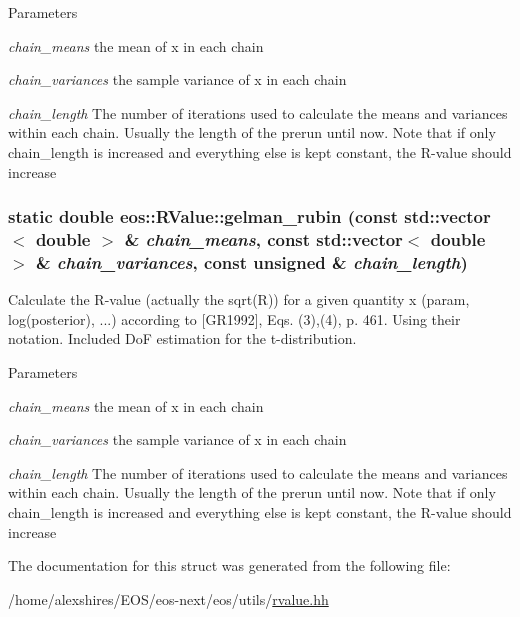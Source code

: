 \begin{DoxyParams}{Parameters}
\item[{\em chain\_\-means}]the mean of x in each chain \item[{\em chain\_\-variances}]the sample variance of x in each chain \item[{\em chain\_\-length}]The number of iterations used to calculate the means and variances within each chain. Usually the length of the prerun until now. Note that if only chain\_\-length is increased and everything else is kept constant, the R-\/value should increase \end{DoxyParams}
\hypertarget{structeos_1_1RValue_ac18b9cf1272e22d614f54fddc82d5072}{
\subsubsection[{gelman\_\-rubin}]{\setlength{\rightskip}{0pt plus 5cm}static double eos::RValue::gelman\_\-rubin (const std::vector$<$ double $>$ \& {\em chain\_\-means}, \/  const std::vector$<$ double $>$ \& {\em chain\_\-variances}, \/  const unsigned \& {\em chain\_\-length})}}
\label{structeos_1_1RValue_ac18b9cf1272e22d614f54fddc82d5072}
Calculate the R-\/value (actually the sqrt(R)) for a given quantity x (param, log(posterior), ...) according to \mbox{[}GR1992\mbox{]}, Eqs. (3),(4), p. 461. Using their notation. Included DoF estimation for the t-\/distribution.


\begin{DoxyParams}{Parameters}
\item[{\em chain\_\-means}]the mean of x in each chain \item[{\em chain\_\-variances}]the sample variance of x in each chain \item[{\em chain\_\-length}]The number of iterations used to calculate the means and variances within each chain. Usually the length of the prerun until now. Note that if only chain\_\-length is increased and everything else is kept constant, the R-\/value should increase \end{DoxyParams}


The documentation for this struct was generated from the following file:\begin{DoxyCompactItemize}
\item 
/home/alexshires/EOS/eos-\/next/eos/utils/\hyperlink{rvalue_8hh}{rvalue.hh}\end{DoxyCompactItemize}
